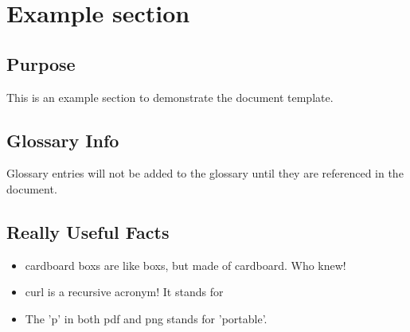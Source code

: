 \section{Example section}

\subsection{Purpose}

This is an example section to demonstrate the document template.

\subsection{Glossary Info}

Glossary entries will not be added to the glossary until they are referenced in
the document.

\subsection{Really Useful Facts}

\begin{itemize}
    \item \Glspl{cardboard box} are like \glspl{box}, but made of cardboard. Who
    knew!
    \item \Gls{curl} is a recursive acronym! It stands for 
    \item The 'p' in both \gls{pdf} and \gls{png} stands for 'portable'.
\end{itemize}
